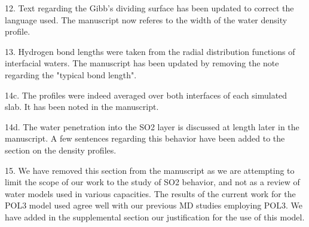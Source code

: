 12. Text regarding the Gibb's dividing surface has been updated to correct the language used. The manuscript now referes to the width of the water density profile.

13. Hydrogen bond lengths were taken from the radial distribution functions of interfacial waters. The manuscript has been updated by removing the note regarding the "typical bond length".

14c. The profiles were indeed averaged over both interfaces of each simulated slab. It has been noted in the manuscript.

14d. The water penetration into the SO2 layer is discussed at length later in the manuscript. A few sentences regarding this behavior have been added to the section on the density profiles.

15. We have removed this section from the manuscript as we are attempting to limit the scope of our work to the study of SO2 behavior, and not as a review of water models used in various capacities. The results of the current work for the POL3 model used agree well with our previous MD studies employing POL3. We have added in the supplemental section our justification for the use of this model.
